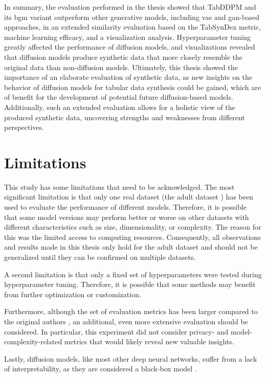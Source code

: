 In summary, the evaluation performed in the thesis showed that TabDDPM and its \gls{bgm} variant outperform other generative models,
including \gls{vae} and \gls{gan}-based approaches, in an extended similarity evaluation based on the TabSynDex metric,
machine learning efficacy, and a visualization analysis.
Hyperparameter tuning greatly affected the performance of diffusion models, and visualizations revealed that diffusion models produce synthetic data that more closely resemble the original data than non-diffusion models.
Ultimately, this thesis showed the importance of an elaborate evaluation of synthetic data, as new insights on the behavior of diffusion models for tabular data synthesis could be gained,
which are of benefit for the development of potential future diffusion-based models.
Additionally, such an extended evaluation allows for a holistic view of the produced synthetic data, uncovering strengths and weaknesses from different perspectives.

\section{Limitations}
\label{ch:results-limitations}

This study has some limitations that need to be acknowledged.
The most significant limitation is that only one real dataset (the adult dataset \cite{Dua:2019}) has been used to evaluate the performance of different models.
Therefore, it is possible that some model versions may perform better or worse on other datasets with different characteristics such as size, dimensionality, or complexity.
The reason for this was the limited access to computing resources.
Consequently, all observations and results made in this thesis only hold for the adult dataset and should not be generalized until they can be confirmed on multiple datasets.

A second limitation is that only a fixed set of hyperparameters were tested during hyperparameter tuning.
Therefore, it is possible that some methods may benefit from further optimization or customization.

Furthermore, although the set of evaluation metrics has been larger compared to the original authors \cite{kotelnikov2022TabDDPMModellingTabular},
an additional, even more extensive evaluation should be considered.
In particular, this experiment did not consider privacy- and model-complexity-related metrics that would likely reveal new valuable insights.

Lastly, diffusion models, like most other deep neural networks, suffer from a lack of interpretability, as they are considered a black-box model \cite{benitez1997AreArtificialNeural}.